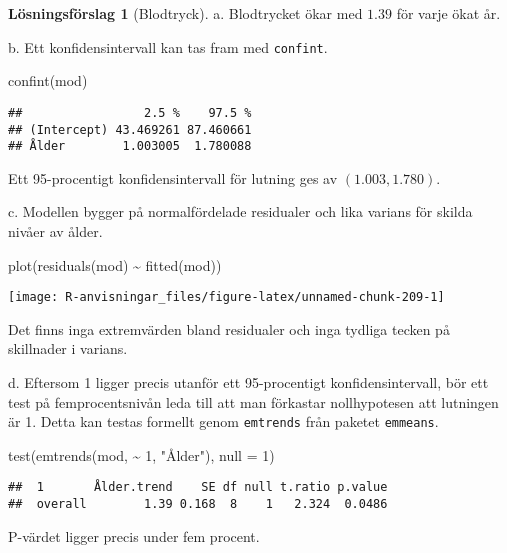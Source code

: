 \documentclass[
]{book}
\newenvironment{Shaded}{\begin{snugshade}}{\end{snugshade}}
\newcommand{\AttributeTok}[1]{\textcolor[rgb]{0.77,0.63,0.00}{#1}}
\newcommand{\DecValTok}[1]{\textcolor[rgb]{0.00,0.00,0.81}{#1}}
\newcommand{\FunctionTok}[1]{\textcolor[rgb]{0.00,0.00,0.00}{#1}}
\newcommand{\NormalTok}[1]{#1}
\newcommand{\SpecialCharTok}[1]{\textcolor[rgb]{0.00,0.00,0.00}{#1}}
\newcommand{\StringTok}[1]{\textcolor[rgb]{0.31,0.60,0.02}{#1}}
\theoremstyle{definition}
\theoremstyle{definition}
\theoremstyle{definition}
\theoremstyle{definition}
\newtheorem{hypothesis}{Lösningsförslag}[chapter]
\theoremstyle{remark}
\begin{document}
\begin{hypothesis}[Blodtryck]
a. Blodtrycket ökar med \(1.39\) för varje ökat år.

b. Ett konfidensintervall kan tas fram med \texttt{confint}.

\begin{Shaded}
\begin{Highlighting}[]
\FunctionTok{confint}\NormalTok{(mod)}
\end{Highlighting}
\end{Shaded}

\begin{verbatim}
##                 2.5 %    97.5 %
## (Intercept) 43.469261 87.460661
## Ålder        1.003005  1.780088
\end{verbatim}

Ett 95-procentigt konfidensintervall för lutning ges av \((1.003, 1.780)\).

c. Modellen bygger på normalfördelade residualer och lika varians för skilda nivåer av ålder.

\begin{Shaded}
\begin{Highlighting}[]
\FunctionTok{plot}\NormalTok{(}\FunctionTok{residuals}\NormalTok{(mod) }\SpecialCharTok{\textasciitilde{}} \FunctionTok{fitted}\NormalTok{(mod))}
\end{Highlighting}
\end{Shaded}

\begin{center}\texttt{[image: R-anvisningar\_files/figure-latex/unnamed-chunk-209-1]} \end{center}

Det finns inga extremvärden bland residualer och inga tydliga tecken på skillnader i varians.

d. Eftersom 1 ligger precis utanför ett 95-procentigt konfidensintervall, bör ett test på femprocentsnivån leda till att man förkastar nollhypotesen att lutningen är 1. Detta kan testas formellt genom \texttt{emtrends} från paketet \texttt{emmeans}.

\begin{Shaded}
\begin{Highlighting}[]
\FunctionTok{test}\NormalTok{(}\FunctionTok{emtrends}\NormalTok{(mod, }\SpecialCharTok{\textasciitilde{}} \DecValTok{1}\NormalTok{, }\StringTok{"Ålder"}\NormalTok{), }\AttributeTok{null =} \DecValTok{1}\NormalTok{)}
\end{Highlighting}
\end{Shaded}

\begin{verbatim}
##  1       Ålder.trend    SE df null t.ratio p.value
##  overall        1.39 0.168  8    1   2.324  0.0486
\end{verbatim}

P-värdet ligger precis under fem procent.
\end{hypothesis}
\end{document}
